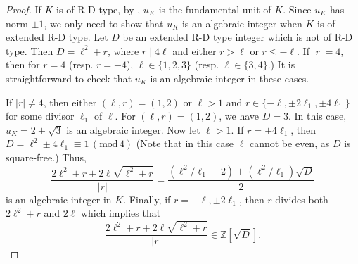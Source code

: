 \documentclass[12pt]{amsart}
\theoremstyle{definition}
\numberwithin{equation}{section}
\begin{document}
\begin{proof}
If $K$ is of R-D type, by \cite[Theorem 1]{Degert}, $u_K$ is the fundamental unit of $K$.
	Since $u_K$ has norm $\pm 1$, we only need to show that $u_K$ is an algebraic integer when $K$ is of extended R-D type. Let
	$D$ be an extended R-D type integer which is not of R-D type. Then $D=\ell^2+r$, where $r \mid 4 \ell$ and either $r > \ell$ or $r \leq -\ell$. 	If $|r|=4$, then for $r=4$ (resp. $r=-4$), $\ell \in \{1,2,3\}$ (resp. $\ell \in \{3,4 \}$.) It is straightforward to check that $u_K$ is an algebraic integer in these cases.

If $|r| \neq 4$, then	either $(\ell,r)=(1,2)$ or $\ell>1$ and $	r \in \{ -\ell, \pm 2 \ell_1, \pm 4 \ell_1 \}$ for some divisor $\ell_1$ of $\ell$. For $(\ell,r)=(1,2)$, we have $D=3$. In this case, $u_K=2+\sqrt{3}$ is an algebraic integer. Now let $\ell >1$. 
If $r=\pm 4 \ell_1$, then $D=\ell^2 \pm 4 \ell_1 \equiv 1 \, (\mathrm{mod}\, 4)$  (Note that in this case $\ell$ cannot be even, as $D$ is square-free.) Thus,
\begin{equation*}
		\frac{	2\ell^2+r + 2 \ell \sqrt{\ell^2+r}}{|r|}=\frac{(\ell^2/\ell_1 \pm 2)+(\ell^2/\ell_1)\sqrt{D} }{2}
\end{equation*}
 is an algebraic integer in $K$.
	Finally, if $r =-\ell,\pm 2 \ell_1$, then $r$ divides both $2 \ell^2+r$ and $2 \ell$ which implies that
	\begin{equation*}
\frac{	2\ell^2+r + 2 \ell \sqrt{\ell^2+r}}{|r|} \in \mathbb{Z}[\sqrt{D}].
	\end{equation*}\end{proof}
	
\end{document}
